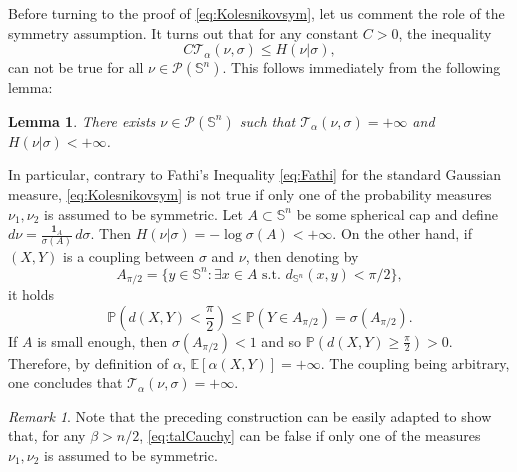 \documentclass[10pt]{amsart}
\newtheorem{lem}[thm]{Lemma}
\theoremstyle{definition}
\theoremstyle{remark}
\newtheorem{rem}[thm]{Remark}
\renewcommand{\P}{\mathbb{P}}
\newcommand{\E}{\mathbb{E}}
\newcommand{\Sd}{\mathbb{S}}
\begin{document}
 Before turning to the proof of \eqref{eq:Kolesnikovsym}, let us comment the role of the symmetry assumption. 
 It turns out that for any constant $C>0$, the inequality 
 \[
 C\mathcal{T}_\alpha(\nu,\sigma) \leq H(\nu|\sigma), 
 \]
can not be true for all $\nu \in \mathcal{P}(\Sd^n)$. This follows immediately from the following lemma:
\begin{lem}\label{lem:nonsym}
There exists $\nu \in \mathcal{P}(\Sd^n)$ such that $\mathcal{T}_\alpha(\nu,\sigma) = +\infty$ and $H(\nu|\sigma)<+\infty$.
\end{lem}
In particular, contrary to Fathi's Inequality \eqref{eq:Fathi} for the standard Gaussian measure, \eqref{eq:Kolesnikovsym} is not true if only one of the probability measures $\nu_1,\nu_2$ is assumed to be symmetric. 
Let $A\subset \Sd^n$ be some spherical cap and define $d\nu = \frac{\mathbf{1}_A}{\sigma(A)}\,d\sigma$. Then $H(\nu| \sigma) = - \log \sigma (A) <+\infty$. On the other hand, if $(X,Y)$ is a coupling between $\sigma$ and $\nu$, then denoting by 
\[
A_{\pi/2} = \{y \in \Sd^n : \exists x \in A \text{ s.t. } d_{\Sd^n}(x,y) <\pi/2\},
\]
it holds
\[
\P(d(X,Y) <\frac{\pi}{2}) \leq \P(Y \in A_{\pi/2}) = \sigma(A_{\pi/2}).
\]
If $A$ is small enough, then $\sigma(A_{\pi/2}) <1$ and so $\P(d(X,Y) \geq \frac{\pi}{2}) >0$. 
Therefore, by definition of $\alpha$, $\E\left[\alpha (X,Y)\right]=+\infty$. The coupling being arbitrary, one concludes that $\mathcal{T}_\alpha (\nu,\sigma)=+\infty$. 
\endproof
\begin{rem}\label{rem:non-Fathi} Note that the preceding construction can be easily adapted to show that, for any $\beta>n/2$, \eqref{eq:talCauchy} can be false if only one of the measures $\nu_1,\nu_2$ is assumed to be symmetric.
\end{rem}
\end{document}
